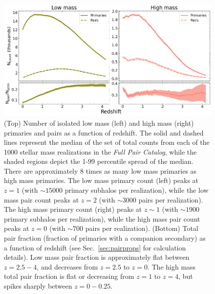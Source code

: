 \documentclass[twocolumn]{aastex631}
\newcommand{\paircat}{\textit{Full Pair Catalog}}
\begin{document}
\begin{figure}[htb]
    \centering
    \includegraphics[width=\textwidth]{counts_1000.png}
    \caption{(Top) Number of isolated low mass (left) and high mass (right) primaries and pairs as a function of redshift.
    The solid and dashed lines represent the median of the set of total counts from each of the 1000 stellar mass realizations in the \paircat, while the shaded regions depict the 1-99 percentile spread of the median.
    There are approximately 8 times as many low mass primaries as high mass primaries. 
    The low mass primary count (left) peaks at $z=1$ (with $\sim 15000$ primary subhalos per realization), while the low mass pair count peaks at $z=2$ (with $\sim 3000$ pairs per realization). 
    The high mass primary count (right) peaks at $z\sim1$ (with $\sim 1900$ primary subhalos per realization), while the high mass pair count peaks at $z=0$ (with $\sim 700$ pairs per realization). 
    (Bottom) Total pair fraction (fraction of primaries with a companion secondary) as a function of redshift (see Sec.~\ref{sec:pairprops} for calculation details).
    Low mass pair fraction is approximately flat between $z=2.5-4$, and decreases from $z=2.5$ to $z=0$. 
    The high mass total pair fraction is flat or decreasing from $z=1$ to $z=4$, but spikes sharply between $z=0-0.25$.}
    \label{fig:counts}
\end{figure}
\end{document}
